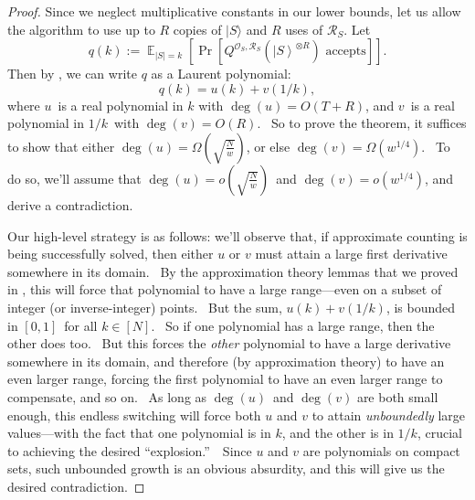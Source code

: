 \documentclass[10pt,a4paper]{article}
\newcommand{\<}{\langle}
\renewcommand{\>}{\rangle}
\DeclareMathOperator{\E}{\mathbb E}
\newcommand{\R}{\mathcal R}
\begin{document}
\begin{proof}
Since we neglect multiplicative constants in our lower bounds, let us allow the algorithm to use up to $R$ copies of $|S\>$ and $R$ uses of $\R_S$.
Let
\begin{equation}
q\left(  k\right)  :=\E_{\left\vert S\right\vert =k}\left[
\Pr\left[  Q^{\mathcal{O}_{S},\R_S}\left(  \left\vert S\right\rangle ^{\otimes
R}\right)  \text{ accepts}\right]  \right]  .
\end{equation}
Then by , we can write $q$ as a Laurent polynomial:
\begin{equation}
q\left(  k\right)  =u\left(  k\right)  +v\left(  1/k\right)  ,
\end{equation}
where $u$\ is a real polynomial in $k$ with $\deg\left(  u\right)  = O(T+R)$,
and $v$\ is a real polynomial in $1/k$\ with $\deg\left(  v\right) = O(R)$.
\ So to prove the theorem, it suffices to show that either $\deg\left(
u\right)  =\Omega\left(  \sqrt{\frac{N}{w}}\right)  $, or else $\deg\left(
v\right)  =\Omega\left(  w^{1/4}\right)  $. \ To do so, we'll assume that
$\deg\left(  u\right)  =o\left(  \sqrt{\frac{N}{w}}\right)  $\ and
$\deg\left(  v\right)  =o\left(  w^{1/4}\right)  $, and derive a contradiction.

Our high-level strategy is as follows: we'll observe that, if approximate
counting is being successfully solved, then either $u$ or $v$ must attain a
large first derivative somewhere in its domain. \ By the approximation theory
lemmas that we proved in , this will force that polynomial to have a large
range---even on a subset of integer (or inverse-integer) points. \ But the
sum, $u\left(  k\right)  +v\left(  1/k\right)  $, is bounded in $\left[
0,1\right]  $\ for all $k\in\left[  N\right]  $. \ So if one polynomial has a
large range, then the other does too. \ But this forces the \textit{other}
polynomial to have a large derivative somewhere in its domain, and therefore
(by approximation theory) to have an even larger range, forcing the first
polynomial to have an even larger range to compensate, and so on. \ As long as
$\deg\left(  u\right)  $\ and $\deg\left(  v\right)  $ are both small enough,
this endless switching will force both $u$ and $v$ to attain
\textit{unboundedly }large values---with the fact that one polynomial is in
$k$, and the other is in $1/k$, crucial to achieving the desired
\textquotedblleft explosion.\textquotedblright\ \ Since $u$ and $v$ are
polynomials on compact sets, such unbounded growth is an obvious absurdity,
and this will give us the desired contradiction.


\end{proof}
\end{document}
